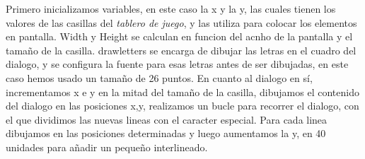 \documentclass[a4paper]{article}
\begin{document}
Primero inicializamos variables, en este caso la x y la y, las cuales tienen los valores de las casillas del \textit{tablero de juego}, y las utiliza para colocar los elementos en pantalla. Width y Height se calculan en funcion del acnho de la pantalla y el tamaño de la casilla.
drawletters se encarga de dibujar las letras en el cuadro del dialogo, y se configura la fuente para esas letras antes de ser dibujadas, en este caso hemos usado un tamaño de 26 puntos. En cuanto al dialogo en sí, incrementamos x e y en la mitad del tamaño de la casilla, dibujamos el contenido del dialogo en las posiciones x,y, realizamos un bucle para recorrer el dialogo, con el que dividimos las nuevas
lineas con el caracter especial. Para cada linea dibujamos en las posiciones determinadas y luego aumentamos la y, en 40 unidades para añadir un pequeño interlineado. \\
\end{document}
